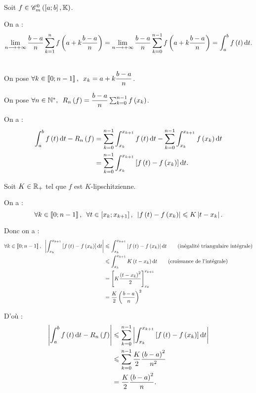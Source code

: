 \begin{prop}
Soit \(f\in\contm\).

On a : \[\lim_{n\to\pinf}\dfrac{b-a}{n}\sum_{k=1}^{n}f\paren{a+k\dfrac{b-a}{n}}=\lim_{n\to\pinf}\dfrac{b-a}{n}\sum_{k=0}^{n-1}f\paren{a+k\dfrac{b-a}{n}}=\int_a^bf\paren{t}\odif{t}.\]
\end{prop}

\begin{dem}~\\
On pose \(\quantifs{\forall k\in\interventierii{0}{n-1}}x_k=a+k\dfrac{b-a}{n}\).

On pose \(\quantifs{\forall n\in\Ns}R_n\paren{f}=\dfrac{b-a}{n}\sum_{k=0}^{n-1}f\paren{x_k}\).

On a : \[\begin{aligned}
\int_a^bf\paren{t}\odif{t}-R_n\paren{f}&=\sum_{k=0}^{n-1}\int_{x_k}^{x_{k+1}}f\paren{t}\odif{t}-\sum_{k=0}^{n-1}\int_{x_k}^{x_{k+1}}f\paren{x_k}\odif{t} \\
&=\sum_{k=0}^{n-1}\int_{x_k}^{x_{k+1}}\croch{f\paren{t}-f\paren{x_k}}\odif{t}.
\end{aligned}\]

Soit \(K\in\mathbb{R}_+\) tel que \(f\) est \(K\)-lipschitzienne.

On a : \[\quantifs{\forall k\in\interventierii{0}{n-1};\forall t\in\intervii{x_k}{x_{k+1}}}\abs{f\paren{t}-f\paren{x_k}}\leq K\abs{t-x_k}.\]

Donc on a : \[\begin{aligned}
\quantifs{\forall k\in\interventierii{0}{n-1}}\abs{\int_{x_k}^{x_{k+1}}\croch{f\paren{t}-f\paren{x_k}}\odif{t}}&\leq\int_{x_k}^{x_{k+1}}\abs{f\paren{t}-f\paren{x_k}}\odif{t}\qquad\text{(inégalité triangulaire intégrale)} \\
&\leq\int_{x_k}^{x_{k+1}}K\paren{t-x_k}\odif{t}\qquad\text{(croissance de l'intégrale)} \\
&=\croch{K\dfrac{\paren{t-x_k}^2}{2}}_{x_k}^{x_{k+1}} \\
&=\dfrac{K}{2}\paren{\dfrac{b-a}{n}}^2
\end{aligned}\]

D'où : \[\begin{aligned}
\abs{\int_a^bf\paren{t}\odif{t}-R_n\paren{f}}&\leq\sum_{k=0}^{n-1}\abs{\int_{x_k}^{x_{k+1}}\croch{f\paren{t}-f\paren{x_k}}\odif{t}} \\
&\leq\sum_{k=0}^{n-1}\dfrac{K}{2}\dfrac{\paren{b-a}^2}{n^2} \\
&=\dfrac{K}{2}\dfrac{\paren{b-a}^2}{n}.
\end{aligned}\]


\end{dem}

